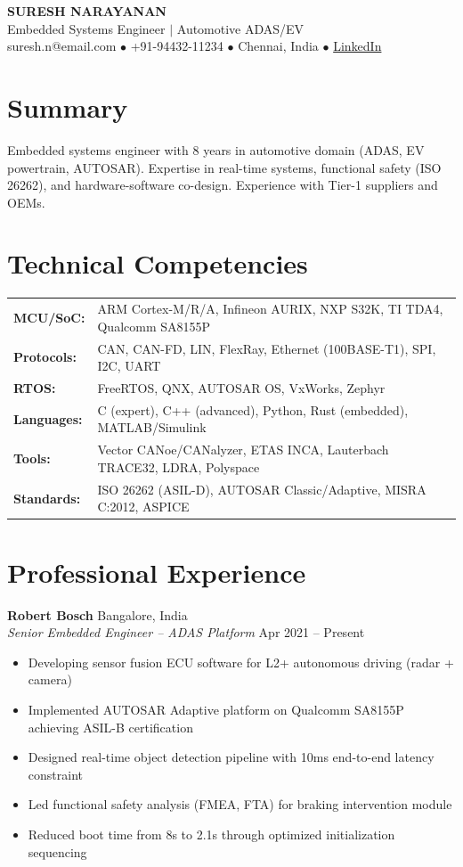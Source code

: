 \documentclass[10pt,letterpaper]{article}
\begin{document}
\begin{center}
{\Large\bfseries SURESH NARAYANAN}\\[3pt]
{\small Embedded Systems Engineer $\vert$ Automotive ADAS/EV}\\[3pt]
{\footnotesize suresh.n@email.com \quad $\bullet$ \quad +91-94432-11234 \quad $\bullet$ \quad Chennai, India \quad $\bullet$ \quad \href{https://linkedin.com/in/sureshn}{LinkedIn}}
\end{center}

\section{Summary}
Embedded systems engineer with 8 years in automotive domain (ADAS, EV powertrain, AUTOSAR). Expertise in real-time systems, functional safety (ISO 26262), and hardware-software co-design. Experience with Tier-1 suppliers and OEMs.

\section{Technical Competencies}
\begin{tabularx}{\linewidth}{@{}lX@{}}
\textbf{MCU/SoC:} & ARM Cortex-M/R/A, Infineon AURIX, NXP S32K, TI TDA4, Qualcomm SA8155P\\
\textbf{Protocols:} & CAN, CAN-FD, LIN, FlexRay, Ethernet (100BASE-T1), SPI, I2C, UART\\
\textbf{RTOS:} & FreeRTOS, QNX, AUTOSAR OS, VxWorks, Zephyr\\
\textbf{Languages:} & C (expert), C++ (advanced), Python, Rust (embedded), MATLAB/Simulink\\
\textbf{Tools:} & Vector CANoe/CANalyzer, ETAS INCA, Lauterbach TRACE32, LDRA, Polyspace\\
\textbf{Standards:} & ISO 26262 (ASIL-D), AUTOSAR Classic/Adaptive, MISRA C:2012, ASPICE\\
\end{tabularx}

\section{Professional Experience}

\textbf{Robert Bosch} \hfill Bangalore, India\\
\textit{Senior Embedded Engineer -- ADAS Platform} \hfill Apr 2021 -- Present
\begin{itemize}
\item Developing sensor fusion ECU software for L2+ autonomous driving (radar + camera)
\item Implemented AUTOSAR Adaptive platform on Qualcomm SA8155P achieving ASIL-B certification
\item Designed real-time object detection pipeline with 10ms end-to-end latency constraint
\item Led functional safety analysis (FMEA, FTA) for braking intervention module
\item Reduced boot time from 8s to 2.1s through optimized initialization sequencing
\end{itemize}
\end{document}
